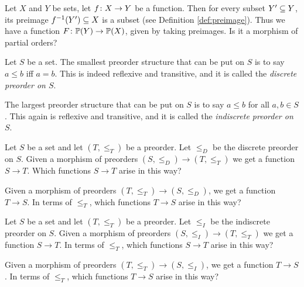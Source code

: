 \begin{applicationRUS}
\end{applicationRUS}

\begin{exerciseENG}
Let $X$ and $Y$ be sets, let $f\taking X\to Y$ be a function. Then for every subset $Y'\ss Y$, its preimage $f^\m1(Y')\ss X$ is a subset (see Definition \ref{def:preimage}). Thus we have a function $F\taking\PP(Y)\to\PP(X)$, given by taking preimages. Is it a morphism of partial orders?
\end{exerciseENG}

\begin{exerciseRUS}
\end{exerciseRUS}

\begin{exampleENG}\label{ex:discrete and indiscrete}
Let $S$ be a set. The smallest preorder structure that can be put on $S$ is to say $a\leq b$ iff $a=b$. This is indeed reflexive and transitive, and it is called the {\em discrete preorder on $S$}.

The largest preorder structure that can be put on $S$ is to say $a\leq b$ for all $a,b\in S$. This again is reflexive and transitive, and it is called the {\em indiscrete preorder on $S$}.
\end{exampleENG}

\begin{exampleRUS}\label{ex:discrete and indiscrete}
\end{exampleRUS}

\begin{exerciseENG}
Let $S$ be a set and let $(T,\leq_T)$ be a preorder. Let $\leq_D$ be the discrete preorder on $S$. Given a morphism of preorders $(S,\leq_D)\to (T,\leq_T)$ we get a function $S\to T$. 
\sexc Which functions $S\to T$ arise in this way? 
\item Given a morphism of preorders $(T,\leq_T)\to(S,\leq_D)$, we get a function $T\to S$. In terms of $\leq_T$, which functions $T\to S$ arise in this way?
\endsexc
\end{exerciseENG}

\begin{exerciseRUS}
\end{exerciseRUS}

\begin{exerciseENG}
Let $S$ be a set and let $(T,\leq_T)$ be a preorder. Let $\leq_I$ be the indiscrete preorder on $S$. Given a morphism of preorders $(S,\leq_I)\to (T,\leq_T)$ we get a function $S\to T$. 
\sexc In terms of $\leq_T$, which functions $S\to T$ arise in this way? 
\item Given a morphism of preorders $(T,\leq_T)\to(S,\leq_I)$, we get a function $T\to S$. In terms of $\leq_T$, which functions $T\to S$ arise in this way?
\endsexc
\end{exerciseENG}

